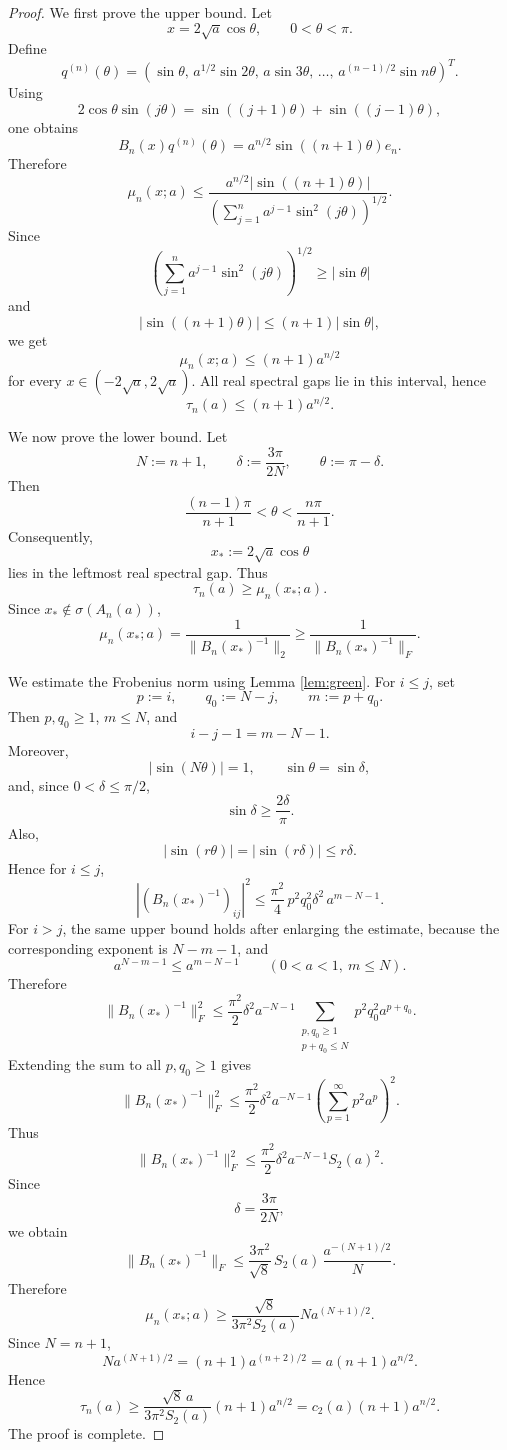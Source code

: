 \documentclass[11pt]{amsart}
\numberwithin{equation}{section}
\begin{document}
\begin{proof}
We first prove the upper bound.  Let
\[
x=2\sqrt a\cos\theta,
\qquad 0<\theta<\pi.
\]
Define
\[
q^{(n)}(\theta)
=
\left(
\sin\theta,\,
a^{1/2}\sin2\theta,\,
a\sin3\theta,\,
\dots,\,
a^{(n-1)/2}\sin n\theta
\right)^T.
\]
Using
\[
2\cos\theta\sin(j\theta)
=
\sin((j+1)\theta)+\sin((j-1)\theta),
\]
one obtains
\[
B_n(x)q^{(n)}(\theta)
=
a^{n/2}\sin((n+1)\theta)e_n.
\]
Therefore
\[
\mu_n(x;a)
\le
\frac{
a^{n/2}|\sin((n+1)\theta)|
}{
\left(\sum_{j=1}^n a^{j-1}\sin^2(j\theta)\right)^{1/2}
}.
\]
Since
\[
\left(\sum_{j=1}^n a^{j-1}\sin^2(j\theta)\right)^{1/2}
\ge |\sin\theta|
\]
and
\[
|\sin((n+1)\theta)|\le(n+1)|\sin\theta|,
\]
we get
\[
\mu_n(x;a)\le(n+1)a^{n/2}
\]
for every \(x\in(-2\sqrt a,2\sqrt a)\).  All real spectral gaps lie in this interval, hence
\[
\tau_n(a)\le(n+1)a^{n/2}.
\]

We now prove the lower bound.  Let
\[
N:=n+1,
\qquad
\delta:=\frac{3\pi}{2N},
\qquad
\theta:=\pi-\delta.
\]
Then
\[
\frac{(n-1)\pi}{n+1}<\theta<\frac{n\pi}{n+1}.
\]
Consequently,
\[
x_*:=2\sqrt a\cos\theta
\]
lies in the leftmost real spectral gap.  Thus
\[
\tau_n(a)\ge \mu_n(x_*;a).
\]
Since \(x_*\notin\sigma(A_n(a))\),
\[
\mu_n(x_*;a)
=
\frac1{\|B_n(x_*)^{-1}\|_2}
\ge
\frac1{\|B_n(x_*)^{-1}\|_F}.
\]

We estimate the Frobenius norm using Lemma \ref{lem:green}.  For \(i\le j\), set
\[
p:=i,
\qquad
q_0:=N-j,
\qquad
m:=p+q_0.
\]
Then \(p,q_0\ge1\), \(m\le N\), and
\[
i-j-1=m-N-1.
\]
Moreover,
\[
|\sin(N\theta)|=1,
\qquad
\sin\theta=\sin\delta,
\]
and, since \(0<\delta\le\pi/2\),
\[
\sin\delta\ge \frac{2\delta}{\pi}.
\]
Also,
\[
|\sin(r\theta)|=|\sin(r\delta)|\le r\delta.
\]
Hence for \(i\le j\),
\[
|(B_n(x_*)^{-1})_{ij}|^2
\le
\frac{\pi^2}{4}\,
p^2q_0^2\delta^2\,
a^{m-N-1}.
\]
For \(i>j\), the same upper bound holds after enlarging the estimate, because the corresponding exponent is \(N-m-1\), and
\[
a^{N-m-1}\le a^{m-N-1}
\qquad(0<a<1,\ m\le N).
\]
Therefore
\[
\|B_n(x_*)^{-1}\|_F^2
\le
\frac{\pi^2}{2}\delta^2a^{-N-1}
\sum_{\substack{p,q_0\ge1\\p+q_0\le N}}
p^2q_0^2a^{p+q_0}.
\]
Extending the sum to all \(p,q_0\ge1\) gives
\[
\|B_n(x_*)^{-1}\|_F^2
\le
\frac{\pi^2}{2}\delta^2a^{-N-1}
\left(\sum_{p=1}^{\infty}p^2a^p\right)^2.
\]
Thus
\[
\|B_n(x_*)^{-1}\|_F^2
\le
\frac{\pi^2}{2}\delta^2a^{-N-1}S_2(a)^2.
\]
Since
\[
\delta=\frac{3\pi}{2N},
\]
we obtain
\[
\|B_n(x_*)^{-1}\|_F
\le
\frac{3\pi^2}{\sqrt8}\,
S_2(a)\,
\frac{a^{-(N+1)/2}}{N}.
\]
Therefore
\[
\mu_n(x_*;a)
\ge
\frac{\sqrt8}{3\pi^2S_2(a)}Na^{(N+1)/2}.
\]
Since \(N=n+1\),
\[
Na^{(N+1)/2}
=
(n+1)a^{(n+2)/2}
=
a(n+1)a^{n/2}.
\]
Hence
\[
\tau_n(a)
\ge
\frac{\sqrt8\,a}{3\pi^2S_2(a)}
(n+1)a^{n/2}
=
c_2(a)(n+1)a^{n/2}.
\]
The proof is complete.
\end{proof}
\end{document}

